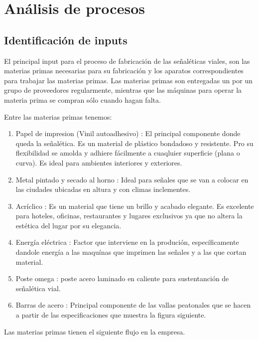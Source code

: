 \section{Análisis de procesos}
	\subsection{Identificación de inputs}

	El principal input para el proceso de fabricación de las señaléticas viales, son las materias primas necesarias para su fabricación y los aparatos correspondientes para trabajar las materias primas. Las materias primas son entregadas un por un grupo de proveedores regularmente, mientras que las máquinas para operar la materia prima se compran sólo cuando hagan falta.
	
	Entre las materias primas tenemos:
	
    \begin{enumerate}[1)]
    \item Papel de impresion (Vinil autoadhesivo) : El principal componente donde queda la señalética. Es un material de plástico bondadoso y resistente. Pro su flexibilidad se amolda y adhiere fácilmente a cuaqluier superficie (plana o curva). Es ideal para ambientes interiores y exteriores.
    \item Metal pintado y secado al horno : Ideal para señales que se van a colocar en las ciudades ubicadas en altura y con climas inclementes.
    \item Acríclico : Es un material que tiene un brillo y acabado elegante. Es excelente para hoteles, oficinas, restaurantes y lugares exclusivos ya que no altera la estética del lugar por su elegancia.
    \item Energía eléctrica : Factor que interviene en la produción, específicamente dandole energía a las maquínas que imprimen las señales y a las que cortan material.
    \item Poste omega :  poste acero laminado en caliente para sustentanción de señalética vial.
    \item Barras de acero : Principal componente de las vallas peatonales que se hacen a partir de las especificaciones que muestra la figura siguiente.
    \newpage
    \end{enumerate}
    
    
    Las materias primas tienen el siguiente flujo en la empresa.

